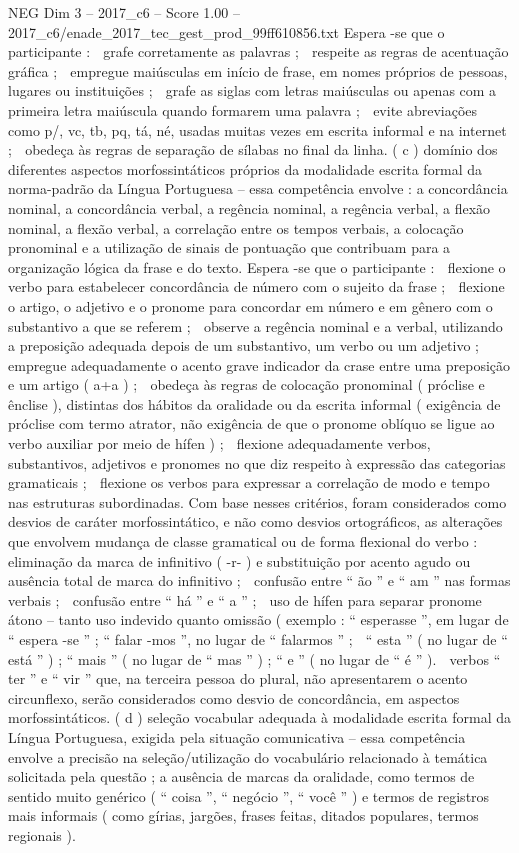 \begin{textsample}{NEG Dim 3 – 2017\_c6 – Score 1.00 – 2017\_c6/enade\_2017\_tec\_gest\_prod\_99ff610856.txt}
Espera -se que o participante :  grafe corretamente as palavras ;  respeite as regras de acentuação gráfica ;  empregue maiúsculas em início de frase, em nomes próprios de pessoas, lugares ou instituições ;  grafe as siglas com letras maiúsculas ou apenas com a primeira letra maiúscula quando formarem uma palavra ;  evite abreviações como p/, vc, tb, pq, tá, né, usadas muitas vezes em escrita informal e na internet ;  obedeça às regras de separação de sílabas no final da linha. ( c ) domínio dos diferentes aspectos morfossintáticos próprios da modalidade escrita formal da norma-padrão da Língua Portuguesa – essa competência envolve : a concordância nominal, a concordância verbal, a regência nominal, a regência verbal, a flexão nominal, a flexão verbal, a correlação entre os tempos verbais, a colocação pronominal e a utilização de sinais de pontuação que contribuam para a organização lógica da frase e do texto.
Espera -se que o participante :  flexione o verbo para estabelecer concordância de número com o sujeito da frase ;  flexione o artigo, o adjetivo e o pronome para concordar em número e em gênero com o substantivo a que se referem ;  observe a regência nominal e a verbal, utilizando a preposição adequada depois de um substantivo, um verbo ou um adjetivo ;  empregue adequadamente o acento grave indicador da crase entre uma preposição e um artigo ( a+a ) ;  obedeça às regras de colocação pronominal ( próclise e ênclise ), distintas dos hábitos da oralidade ou da escrita informal ( exigência de próclise com termo atrator, não exigência de que o pronome oblíquo se ligue ao verbo auxiliar por meio de hífen ) ;  flexione adequadamente verbos, substantivos, adjetivos e pronomes no que diz respeito à expressão das categorias gramaticais ;  flexione os verbos para expressar a correlação de modo e tempo nas estruturas subordinadas.
Com base nesses critérios, foram considerados como desvios de caráter morfossintático, e não como desvios ortográficos, as alterações que envolvem mudança de classe gramatical ou de forma flexional do verbo :  eliminação da marca de infinitivo ( -r- ) e substituição por acento agudo ou ausência total de marca do infinitivo ;  confusão entre “ ão ” e “ am ” nas formas verbais ;  confusão entre “ há ” e “ a ” ;  uso de hífen para separar pronome átono – tanto uso indevido quanto omissão ( exemplo : “ esperasse ”, em lugar de “ espera -se ” ; “ falar -mos ”, no lugar de “ falarmos ” ;  “ esta ” ( no lugar de “ está ” ) ; “ mais ” ( no lugar de “ mas ” ) ; “ e ” ( no lugar de “ é ” ).  verbos “ ter ” e “ vir ” que, na terceira pessoa do plural, não apresentarem o acento circunflexo, serão considerados como desvio de concordância, em aspectos morfossintáticos. ( d ) seleção vocabular adequada à modalidade escrita formal da Língua Portuguesa, exigida pela situação comunicativa – essa competência envolve a precisão na seleção/utilização do vocabulário relacionado à temática solicitada pela questão ; a ausência de marcas da oralidade, como termos de sentido muito genérico ( “ coisa ”, “ negócio ”, “ você ” ) e termos de registros mais informais ( como gírias, jargões, frases feitas, ditados populares, termos regionais ).

\end{textsample}
